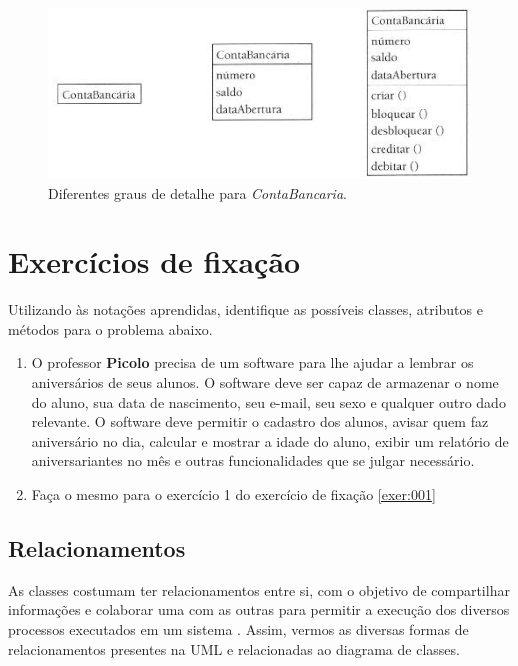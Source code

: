 \begin{figure}[H]
	\centering
	\includegraphics[scale=0.5]{imagens/exemplo-classe-conta-bancaria.png}
	\caption{Diferentes graus de detalhe para \textit{ContaBancaria}.}
	\label{fig:exemplo-classe-conta-bancaria}
\end{figure}

\section{Exercícios de fixação}

Utilizando às notações aprendidas, identifique as possíveis classes, atributos e métodos para o problema abaixo.

\begin{enumerate}
	\item O professor \textbf{Picolo} precisa de um software para lhe ajudar a lembrar os aniversários de seus alunos. O software deve ser capaz de armazenar o nome do aluno, sua data de nascimento, seu e-mail, seu sexo e qualquer outro dado relevante. O software deve permitir o cadastro dos alunos, avisar quem faz aniversário no dia, calcular e mostrar a idade do aluno, exibir um relatório de aniversariantes no mês e outras funcionalidades que se julgar necessário.
	\item Faça o mesmo para o exercício 1 do exercício de fixação \ref{exer:001}
\end{enumerate}

\subsection{Relacionamentos}

As classes costumam ter relacionamentos entre si, com o objetivo de compartilhar informações e colaborar uma com as outras para permitir a execução dos diversos processos executados em um sistema \cite{guedes2018uml}. Assim, vermos as diversas formas de relacionamentos presentes na UML e relacionadas ao diagrama de classes.


